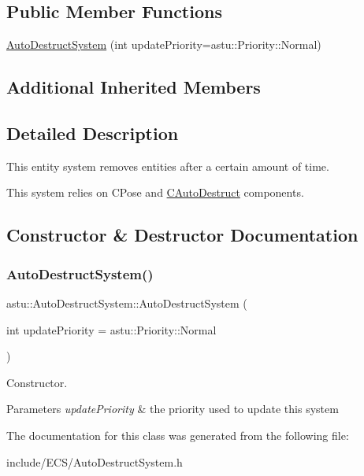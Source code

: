 \subsection*{Public Member Functions}
\begin{DoxyCompactItemize}
\item 
\hyperlink{classastu_1_1AutoDestructSystem_a01cf2ca0427902e70bc2767cbc00b447}{Auto\+Destruct\+System} (int update\+Priority=astu\+::\+Priority\+::\+Normal)
\end{DoxyCompactItemize}
\subsection*{Additional Inherited Members}


\subsection{Detailed Description}
This entity system removes entities after a certain amount of time.

This system relies on C\+Pose and \hyperlink{classastu_1_1CAutoDestruct}{C\+Auto\+Destruct} components. 

\subsection{Constructor \& Destructor Documentation}
\mbox{\label{classastu_1_1AutoDestructSystem_a01cf2ca0427902e70bc2767cbc00b447}} 
\subsubsection{\texorpdfstring{Auto\+Destruct\+System()}{AutoDestructSystem()}}
{\footnotesize\ttfamily astu\+::\+Auto\+Destruct\+System\+::\+Auto\+Destruct\+System (\begin{DoxyParamCaption}\item[{int}]{update\+Priority = {\ttfamily astu\+:\+:Priority\+:\+:Normal} }\end{DoxyParamCaption})}

Constructor.


\begin{DoxyParams}{Parameters}
{\em update\+Priority} & the priority used to update this system \\
\hline
\end{DoxyParams}


The documentation for this class was generated from the following file\+:\begin{DoxyCompactItemize}
\item 
include/\+E\+C\+S/Auto\+Destruct\+System.\+h\end{DoxyCompactItemize}
